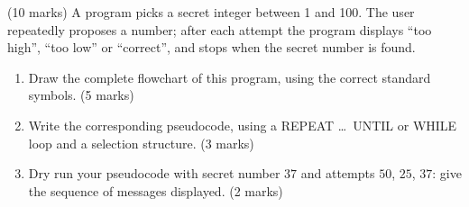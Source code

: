 \documentclass[11pt]{article}
\begin{document}
\begin{exercice} \hfill (10 marks)
A program picks a secret integer between 1 and 100. The user repeatedly proposes a number; after each attempt the program displays ``too high'', ``too low'' or ``correct'', and stops when the secret number is found.
\begin{enumerate}
\item Draw the complete flowchart of this program, using the correct standard symbols. \hfill (5 marks)
\item Write the corresponding pseudocode, using a REPEAT \ldots\ UNTIL or WHILE loop and a selection structure. \hfill (3 marks)
\item Dry run your pseudocode with secret number $37$ and attempts $50$, $25$, $37$: give the sequence of messages displayed. \hfill (2 marks)
\end{enumerate}
\end{exercice}
\end{document}
